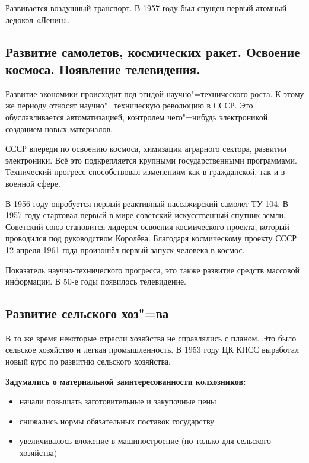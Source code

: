 Развивается воздушный транспорт. В 1957 году был спущен первый атомный ледокол «Ленин».

\subsection{Развитие самолетов, космических ракет. Освоение космоса. Появление телевидения.}

Развитие экономики происходит под эгидой научно"=технического роста. К этому же периоду относят научно"=техническую революцию в СССР. Это обуславливается автоматизацией, контролем чего"=нибудь электроникой, созданием новых материалов. 

СССР впереди по освоению космоса, химизации аграрного сектора, развитии электроники. Всё это подкрепляется крупными государственными программами. Технический прогресс способствовал изменениям как в гражданской, так и в военной сфере. 

В 1956 году опробуется первый реактивный пассажирский самолет ТУ-104. В 1957 году стартовал первый в мире советский искусственный спутник земли. Советский союз становится лидером освоения космического проекта, который проводился под руководством Королёва. Благодаря космическому проекту СССР 12 апреля 1961 года произошёл первый запуск человека в космос.

Показатель научно-технического прогресса, это также развитие средств массовой информации. В 50-е годы появилось телевидение. 

\subsection{Развитие сельского хоз"=ва}

В то же время некоторые отрасли хозяйства не справлялись с планом. Это было сельское хозяйство и легкая промышленность. В 1953 году ЦК КПСС выработал новый курс по развитию сельского хозяйства. 

\textbf{Задумались о материальной заинтересованности колхозников:} 

\begin{itemize}
    \item начали повышать заготовительные и закупочные цены
    \item снижались нормы обязательных поставок государству
    \item увеличивалось вложение в машиностроение (но только для сельского хозяйства)
\end{itemize}

